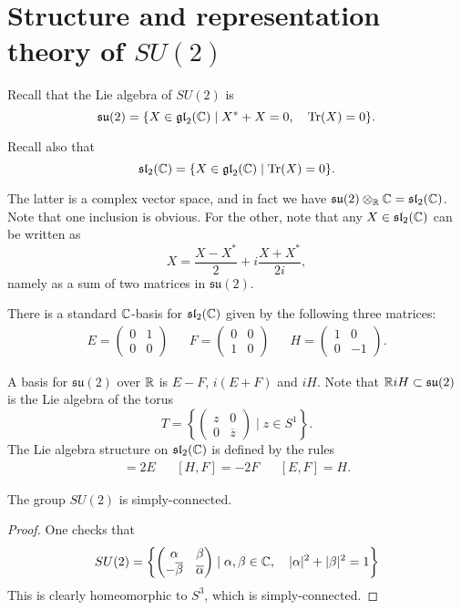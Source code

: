 \documentclass[11pt, english]{article}
\begin{document}
\newpage
\section{Structure and representation theory of $SU(2)$}

Recall that the Lie algebra of $SU(2)$ is
$$
\mathfrak{su}(2) = \{ X \in \mathfrak{gl}_2(\mathbb{C}) \mid X^\ast + X = 0, \quad \operatorname{Tr}(X) = 0\} .
$$

Recall also that
$$
\mathfrak{sl}_2(\mathbb{C}) = \{ X \in \mathfrak{gl}_2(\mathbb{C}) \mid \operatorname{Tr}(X) = 0 \}.
$$

The latter is a complex vector space, and in fact we have $\mathfrak{su}(2) \otimes_{\mathbb{R}} \mathbb{C} = \mathfrak{sl}_2(\mathbb{C})$. Note that one inclusion is obvious. For the other, note that any $X \in \mathfrak{sl}_2(\mathbb{C})$ can be written as 
$$
X = \frac{X-X^\ast}{2} + i \frac{X+X^\ast}{2i},
$$
namely as a sum of two matrices in $\mathfrak{su}(2)$. 

There is a standard $\mathbb{C}$-basis for $\mathfrak{sl}_2(\mathbb{C})$ given by the following three matrices:
\begin{align*}
E = \begin{pmatrix}
0 & 1 \\
0 & 0 
\end{pmatrix} &&
F = \begin{pmatrix} 
0 & 0 \\
1 & 0 
\end{pmatrix} &&
H = \begin{pmatrix}
1 & 0 \\
0 & - 1
\end{pmatrix}.
\end{align*}

A basis for $\mathfrak{su}(2)$ over $\mathbb{R}$ is $E-F$, $i(E+F)$ and $iH$. Note that $\mathbb{R} i H \subset \mathfrak{su}(2)$ is the Lie algebra of the torus 
$$
T = \left\{ \begin{pmatrix}
z & 0 \\
0 & \overline z 
\end{pmatrix} \mid z \in S^1
\right\}.
$$
The Lie algebra structure on $\mathfrak{sl}_2(\mathbb{C})$ is defined by the rules
\begin{align*}
[H,E] = 2E && [H,F] = -2F && [E,F] = H.
\end{align*}

\begin{lemma}
The group $SU(2)$ is simply-connected.
\end{lemma}
\begin{proof}
One checks that
$$
SU(2) =\left\{ \begin{pmatrix}
\alpha & \beta \\
-\overline \beta & \overline \alpha 
\end{pmatrix}
\mid \alpha, \beta \in \mathbb{C}, \quad |\alpha|^2 + |\beta|^2 = 1
\right\}
$$
This is clearly homeomorphic to $S^3$, which is simply-connected.
\end{proof}
\end{document}
